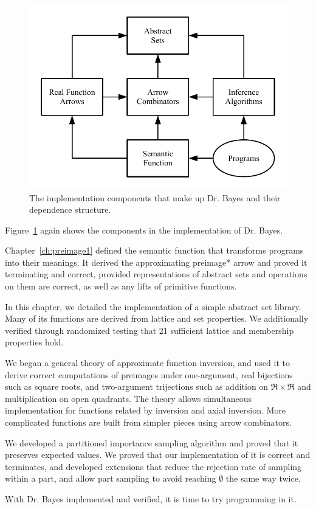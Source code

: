 \begin{figure}[tb!]\centering
\includegraphics[width=4.75in]{figures/implementation-components-2}
\caption[Implementation dependency graph]{The implementation components that make up Dr. Bayes and their dependence structure.}
\label{fig:implementation-components-2}
\end{figure}

Figure~\ref{fig:implementation-components-2} again shows the components in the implementation of Dr. Bayes.

Chapter~\ref{ch:preimage1} defined the semantic function that transforms programs into their meanings.
It derived the approximating preimage* arrow and proved it terminating and correct, provided representations of abstract sets and operations on them are correct, as well as any lifts of primitive functions.

In this chapter, we detailed the implementation of a simple abstract set library.
Many of its functions are derived from lattice and set properties.
We additionally verified through randomized testing that 21 sufficient lattice and membership properties hold.

We began a general theory of approximate function inversion, and used it to derive correct computations of preimages under one-argument, real bijections such as square roots, and two-argument trijections such as addition on $\Re \times \Re$ and multiplication on open quadrants.
The theory allows simultaneous implementation for functions related by inversion and axial inversion.
More complicated functions are built from simpler pieces using arrow combinators.

We developed a partitioned importance sampling algorithm and proved that it preserves expected values.
We proved that our implementation of it is correct and terminates, and developed extensions that reduce the rejection rate of sampling within a part, and allow part sampling to avoid reaching $\emptyset$ the same way twice.

With Dr. Bayes implemented and verified, it is time to try programming in it.


